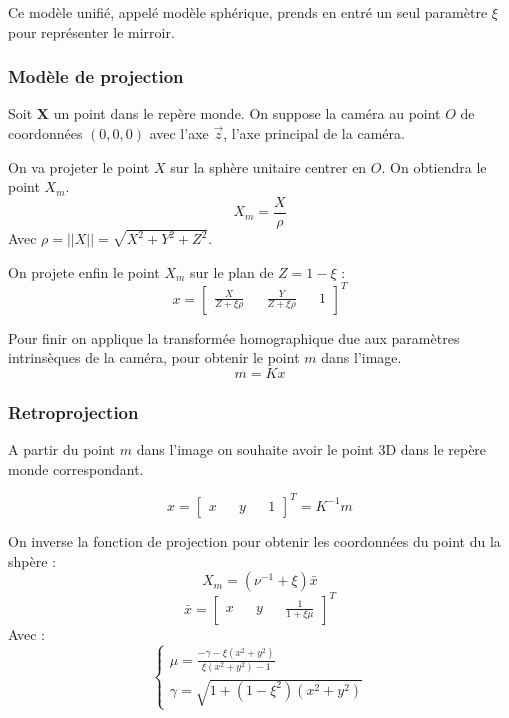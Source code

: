 Ce modèle unifié, appelé modèle sphérique, prends en entré un seul paramètre $\xi$ pour représenter le mirroir.


\subsubsection{Modèle de projection}

Soit $\mathbf{X}$ un point dans le repère monde.
On suppose la caméra au point $O$ de coordonnées $(0,0,0)$ avec l'axe $\vec{z}$, l'axe principal de la caméra.

On va projeter le point $X$ sur la sphère unitaire centrer en $O$. On obtiendra le point $X_m$.
\begin{equation}
X_m = \frac{X}{\rho}
\end{equation}
Avec $\rho = ||X|| = \sqrt{X^2+Y^2+Z^2}$.

On projete enfin le point $X_m$ sur le plan de $Z = 1 - \xi$ :
\begin{equation}
x = \begin{bmatrix}  \frac{X}{Z+\xi \rho} && \frac{Y}{Z +\xi \rho} && 1 \end{bmatrix}^{T}
\end{equation}

Pour finir on applique la transformée homographique due aux paramètres intrinsèques de la caméra, pour obtenir le point $m$ dans l'image.
\begin{equation}
m= K x
\end{equation}

\subsubsection{Retroprojection}

A partir du point $m$ dans l'image on souhaite avoir le point 3D dans le repère monde correspondant.

\begin{equation}
x = \begin{bmatrix} x && y && 1 \end{bmatrix}^{T} = K^{-1} m
\end{equation}

On inverse la fonction de projection pour obtenir les coordonnées du point du la shpère :
\begin{equation}
X_m = (\nu^{-1} + \xi) \bar{x}
\end{equation}
\begin{equation}
\bar{x} = \begin{bmatrix}x && y && \frac{1}{1+\xi \mu} \end{bmatrix}^{T}
\end{equation}
Avec :
\begin{equation}
  \left \{
  \begin{matrix}
    \mu = \frac{-\gamma-\xi(x^2+y^2)}{\xi(x^2+y^2)-1} \\
    \gamma = \sqrt{1+(1-\xi^2)(x^2+y^2)}
  \end{matrix}
 \right.
\end{equation}



